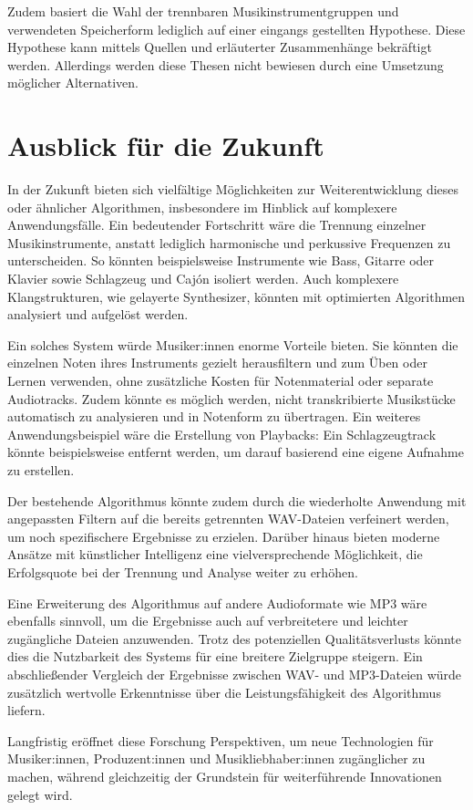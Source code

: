 \par

Zudem basiert die Wahl der trennbaren Musikinstrumentgruppen und verwendeten Speicherform lediglich auf einer eingangs gestellten Hypothese.
Diese Hypothese kann mittels Quellen und erläuterter Zusammenhänge bekräftigt werden.
Allerdings werden diese Thesen nicht bewiesen durch eine Umsetzung möglicher Alternativen.

%
\section{Ausblick für die Zukunft}
%

In der Zukunft bieten sich vielfältige Möglichkeiten zur Weiterentwicklung dieses oder ähnlicher Algorithmen, insbesondere im Hinblick auf komplexere Anwendungsfälle. Ein bedeutender Fortschritt wäre die Trennung einzelner Musikinstrumente, anstatt lediglich harmonische und perkussive Frequenzen zu unterscheiden. So könnten beispielsweise Instrumente wie Bass, Gitarre oder Klavier sowie Schlagzeug und Cajón isoliert werden. Auch komplexere Klangstrukturen, wie gelayerte Synthesizer, könnten mit optimierten Algorithmen analysiert und aufgelöst werden.

Ein solches System würde Musiker:innen enorme Vorteile bieten. Sie könnten die einzelnen Noten ihres Instruments gezielt herausfiltern und zum Üben oder Lernen verwenden, ohne zusätzliche Kosten für Notenmaterial oder separate Audiotracks. Zudem könnte es möglich werden, nicht transkribierte Musikstücke automatisch zu analysieren und in Notenform zu übertragen. Ein weiteres Anwendungsbeispiel wäre die Erstellung von Playbacks: Ein Schlagzeugtrack könnte beispielsweise entfernt werden, um darauf basierend eine eigene Aufnahme zu erstellen.

Der bestehende Algorithmus könnte zudem durch die wiederholte Anwendung mit angepassten Filtern auf die bereits getrennten WAV-Dateien verfeinert werden, um noch spezifischere Ergebnisse zu erzielen. Darüber hinaus bieten moderne Ansätze mit künstlicher Intelligenz eine vielversprechende Möglichkeit, die Erfolgsquote bei der Trennung und Analyse weiter zu erhöhen.

Eine Erweiterung des Algorithmus auf andere Audioformate wie MP3 wäre ebenfalls sinnvoll, um die Ergebnisse auch auf verbreitetere und leichter zugängliche Dateien anzuwenden. Trotz des potenziellen Qualitätsverlusts könnte dies die Nutzbarkeit des Systems für eine breitere Zielgruppe steigern. Ein abschließender Vergleich der Ergebnisse zwischen WAV- und MP3-Dateien würde zusätzlich wertvolle Erkenntnisse über die Leistungsfähigkeit des Algorithmus liefern.

Langfristig eröffnet diese Forschung Perspektiven, um neue Technologien für Musiker:innen, Produzent:innen und Musikliebhaber:innen zugänglicher zu machen, während gleichzeitig der Grundstein für weiterführende Innovationen gelegt wird.
